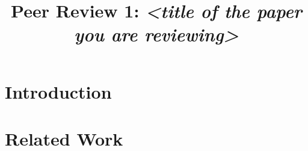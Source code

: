 \documentclass[conference,a4paper]{IEEEtran}
\newif\ifguidance
\newcommand{\guidance}[1]{\ifguidance{\itshape\small #1\par\medskip}\fi}
\begin{document}
\title{Peer Review 1: \textit{<title of the paper you are reviewing>}}

\author{
}

\maketitle


\guidance{Every italic note in this document is guidance.
Delete each one as you write its section, then set
\texttt{\textbackslash guidancefalse} in the preamble: the PDF you submit
carries no guidance.

The sections below are the parts of the paper, in the paper's own order. Write
about each one where it belongs: a defect goes in the section it affects.

Reviews are double-blind. Your name stays out of this document. Your
submission on Moodle is what tells the instructor the review is yours. The
instructor numbers the reviews when he forwards them, from the author's side,
so this file being your first review says nothing about the number it arrives
under.

The paper you receive comes without its AI Usage Journal, which the author
wrote and the instructor marks separately, and with an archive holding the
script you are asked to run in Section~IV.

This review carries no score of any kind. Each author receives two reviews of
their paper. Marks reach students in mid-February.}

\section{Introduction}
\guidance{What question does the paper set out to answer, and does the paper
answer it? Take the claims the introduction makes and say whether the rest of
the paper supports them.}

\section{Related Work}
\guidance{Check the references. Do they exist, and do they say what they are
cited for? Then judge whether the section situates the author's own
contribution, or only lists other people's.}
\end{document}
